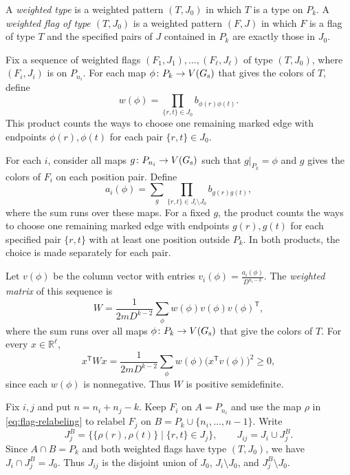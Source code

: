 \documentclass[preprint,11pt,numbers]{elsarticle-arxiv}
\numberwithin{equation}{section}
\theoremstyle{definition}
\begin{document}
A \emph{weighted type} is a weighted pattern $(T,J_0)$ in which
$T$ is a type on $P_k$. A \emph{weighted flag of type $(T,J_0)$}
is a weighted pattern $(F,J)$ in which $F$ is a flag of type $T$
and the specified pairs of $J$ contained in $P_k$ are exactly
those in $J_0$.

Fix a sequence of weighted flags $(F_1,J_1),\ldots,(F_\ell,J_\ell)$
of type $(T,J_0)$, where $(F_i,J_i)$ is on $P_{n_i}$. For each map
$\phi\colon P_k\to V(G_{\rm s})$ that gives the colors of $T$, define
\[
 w(\phi)=\prod_{\{r,t\}\in J_0} b_{\phi(r)\phi(t)}.
\]
This product counts the ways to choose one remaining marked edge
with endpoints $\phi(r),\phi(t)$ for each pair $\{r,t\}\in J_0$.

For each $i$, consider all maps $g\colon P_{n_i}\to V(G_{\rm s})$
such that $g|_{P_k}=\phi$ and $g$ gives the colors of $F_i$ on each
position pair. Define
\[
 a_i(\phi)=\sum_g\prod_{\{r,t\}\in J_i\setminus J_0} b_{g(r)g(t)},
\]
where the sum runs over these maps. For a fixed $g$, the product counts
the ways to choose one remaining marked edge with endpoints $g(r),g(t)$
for each specified pair $\{r,t\}$ with at least one position outside
$P_k$. In both products, the choice is made separately for each pair.

Let $v(\phi)$ be the column vector with entries
$v_i(\phi)=\frac{a_i(\phi)}{D^{n_i-k}}$. The \emph{weighted matrix}
of this sequence is
\[
 W=\frac{1}{2mD^{k-2}}\sum_\phi w(\phi)v(\phi)v(\phi)^{\mathsf T},
\]
where the sum runs over all maps $\phi\colon P_k\to V(G_{\rm s})$
that give the colors of $T$. For every $x\in\mathbb R^\ell$,
\[
 x^{\mathsf T}Wx=\frac{1}{2mD^{k-2}}\sum_\phi
 w(\phi)\bigl(x^{\mathsf T}v(\phi)\bigr)^2\geq0,
\]
since each $w(\phi)$ is nonnegative. Thus $W$ is positive
semidefinite.

Fix $i,j$ and put $n=n_i+n_j-k$. Keep $F_i$ on $A=P_{n_i}$ and
use the map $\rho$ in \eqref{eq:flag-relabeling} to relabel $F_j$
on $B=P_k\cup\{n_i,\ldots,n-1\}$. Write
\[
 J_j^B=\bigl\{\{\rho(r),\rho(t)\}\mid\{r,t\}\in J_j\bigr\},
 \qquad J_{ij}=J_i\cup J_j^B.
\]
Since $A\cap B=P_k$ and both weighted flags have type $(T,J_0)$,
we have $J_i\cap J_j^B=J_0$. Thus $J_{ij}$ is the disjoint union of
$J_0$, $J_i\setminus J_0$, and $J_j^B\setminus J_0$.
\end{document}
